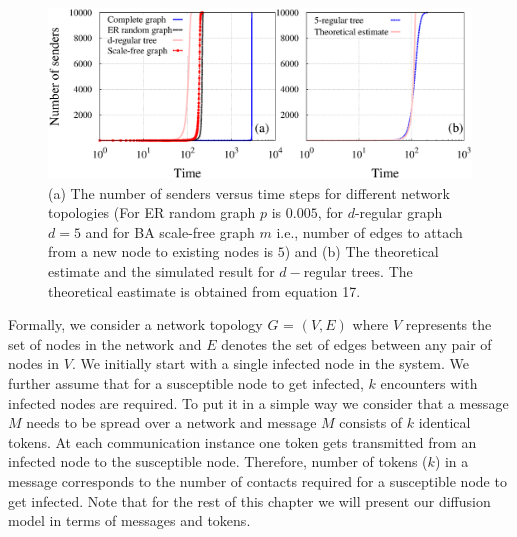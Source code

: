  
 \begin{figure}[htpb]
  \centering
  \includegraphics[scale=0.38]{./texfiles/Chapter_3/epl/figs1/plot_all.eps}
 
 \caption{\label{fig1} (a) The number of senders versus time steps for different network topologies (For ER random graph $p$ is $0.005$, for $d$-regular graph $d=5$ and for BA scale-free graph $m$ i.e., number of edges to attach from a new node to existing nodes is $5$) and 
 (b) The theoretical estimate and the simulated result for $d-$regular trees. The theoretical eastimate is obtained from equation 17.}
 \vspace{.5cm}
\end{figure}
 
 
Formally, we consider a network topology $G$ = $(V,E)$ where $V$ represents the set of
nodes in the network and $E$ denotes the set of edges between any pair of nodes in $%
V $. We initially start with a single infected node in the system. We
further assume that for a susceptible node to get infected,  $k$ encounters
with infected nodes are required. To put it in a simple way we consider that
a message $M$ needs to be spread over a network and message $M$ consists of $%
k$  identical tokens. At each communication instance one token gets transmitted from an
infected node to the susceptible node. Therefore, number of tokens ($k$) in a
message corresponds to the number of contacts required for a susceptible
node to get infected. Note that for the rest of this chapter we will present
our diffusion model in terms of messages and tokens. 

